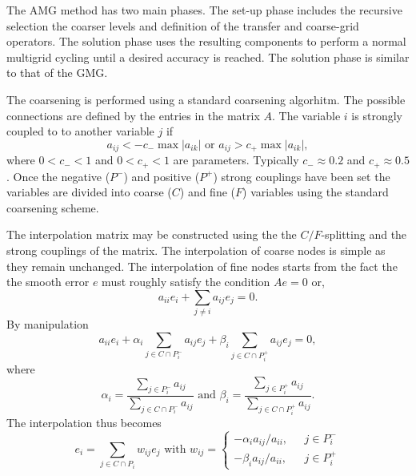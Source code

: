The AMG method has two main phases. The set-up phase includes the recursive selection
the coarser levels and definition of the transfer and coarse-grid operators. 
The solution phase uses the resulting components to perform a normal multigrid
cycling until a desired accuracy is reached. The solution phase is similar
to that of the GMG.

The coarsening is performed using a standard coarsening algorhitm. 
The possible connections are defined by the 
entries in the matrix $A$. The variable $i$ is strongly coupled
to to another variable $j$ if 
\begin{equation}
  a_{ij} < - c_{-} \max | a_{ik} |  \mbox{\ \ \ or \ \ \ }
  a_{ij} > c_{+} \max | a_{ik} | ,
\end{equation}
where $0<c_{-}<1$ and $0<c_{+}<1$ are parameters.
Typically $c_{-} \approx 0.2$ and $c_{+} \approx 0.5$.  
Once the negative ($P^{-}$) and positive ($P^{+}$) 
strong couplings have been set 
the variables are divided into coarse ($C$) and fine ($F$) 
variables using the standard coarsening scheme.

The interpolation matrix may be constructed 
using the the $C/F$-splitting and the strong couplings of the matrix.
The interpolation of coarse nodes is simple as they remain unchanged. 
The interpolation of fine nodes 
starts from the fact the the smooth error $e$ 
must roughly satisfy the condition $Ae=0$ or,
\begin{equation}
  a_{ii} e_i + \sum_{j \neq i} a_{ij} e_j = 0 .
  \label{eq_interpolate}
\end{equation}
By manipulation 
\begin{equation}
  a_{ii} e_i + \alpha_i \sum_{j \in C \cap P_i^{-}} a_{ij} e_j +
\beta_i \sum_{j \in C \cap P_i^{+}} a_{ij} e_j = 0,
\end{equation}
where
\begin{equation}
  \alpha_i = \frac{ \sum_{j \in P_i^{-}} a_{ij} }{ \sum_{j \in C \cap P_i^{-}} a_{ij}  }
 \mbox{\ \ \ and \ \ \ }
  \beta_i = \frac{ \sum_{j \in P_i^{+}} a_{ij} }{ \sum_{j \in C \cap P_i^{+}} a_{ij}  } .
\end{equation}
The interpolation thus becomes 
\begin{equation}
  e_i = \sum_{j \in C \cap P_i} w_{ij} e_j  \mbox{ \ \ \ with \ \ \ }
w_{ij} = \left \{ 
\begin{array}{ll}
-\alpha_i a_{ij} / a_{ii}, \mbox{ \ } & j \in P_i^{-} \\
-\beta_i a_{ij} / a_{ii},               & j \in P_i^{+}
\end{array} 
\right .
\end{equation}


